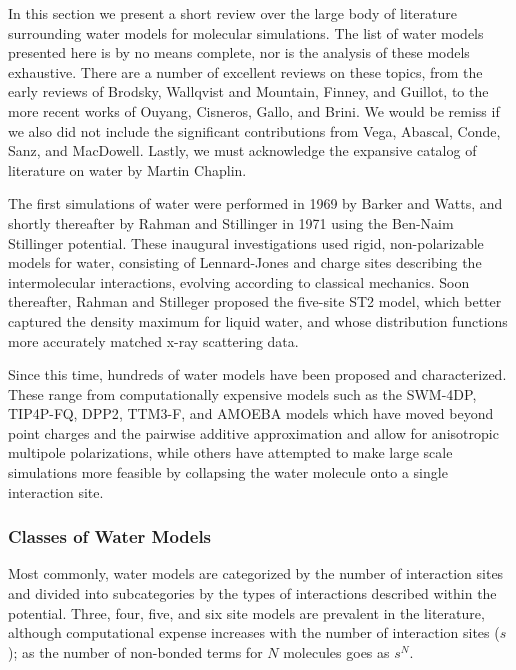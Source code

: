 In this section we present a short review over the large body of
literature surrounding water models for molecular simulations. The
list of water models presented here is by no means complete, nor is
the analysis of these models exhaustive. There are a number of
excellent reviews on these topics, from the early reviews of
Brodsky\cite{Brodsky1996}, Wallqvist and Mountain\cite{Wallqvist1999},
Finney\cite{Finney2001}, and Guillot\cite{Guillot2002}, to the more
recent works of Ouyang\cite{Ouyang2015}, Cisneros\cite{Cisneros2016},
Gallo\cite{Gallo2016}, and Brini\cite{Brini2017}. We would be remiss
if we also did not include the significant contributions from Vega,
Abascal, Conde, Sanz, and
MacDowell.\cite{MacDowell2004,Vega2005,Vega2005c,Abascal2007,Abascal2007a,Abascal2007b,Abascal2007c,Vega2009,Vega2011,Vega2011a,Vega2015}
Lastly, we must acknowledge the expansive catalog of literature on
water by Martin Chaplin.\cite{Chaplin2018}

The first simulations of water were performed in 1969 by Barker and
Watts,\cite{Barker1969} and shortly thereafter by Rahman and
Stillinger in 1971\cite{Rahman1971} using the Ben-Naim Stillinger
potential\cite{Ben-Naim1972}. These inaugural investigations used
rigid, non-polarizable models for water, consisting of Lennard-Jones
and charge sites describing the intermolecular interactions, evolving
according to classical mechanics. Soon thereafter, Rahman and
Stilleger proposed the five-site ST2 model, which better captured the
density maximum for liquid water, and whose distribution functions
more accurately matched x-ray scattering data.\cite{Stillinger1974}

Since this time, hundreds of water models have been proposed and
characterized.\cite{Chaplin2018} These range from computationally
expensive models such as the SWM-4DP\cite{Lamourex2003},
TIP4P-FQ\cite{Rick1994}, DPP2\cite{Kumar2010},
TTM3-F\cite{Fanourgakis2008}, and AMOEBA\cite{Ren2003,Ren2004} models
which have moved beyond point charges and the pairwise additive
approximation and allow for anisotropic multipole polarizations, while
others have attempted to make large scale simulations more feasible by
collapsing the water molecule onto a single interaction
site\cite{Liu1996,Tan2003,Fennell2004}.

\subsubsection{Classes of Water Models}
Most commonly, water models are categorized by the number of
interaction sites and divided into subcategories by the types of
interactions described within the potential. Three, four, five, and
six site models are prevalent in the literature, although
computational expense increases with the number of interaction sites
($s$); as the number of non-bonded terms for $N$ molecules goes as
$s^N$. 

